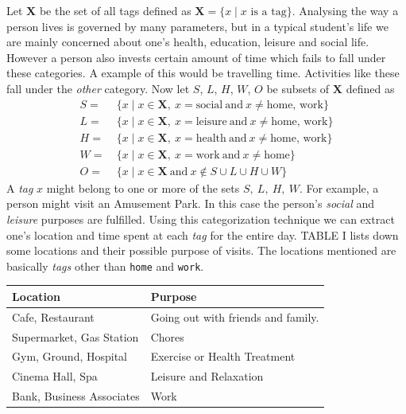 \documentclass[conference]{IEEEtran}
\begin{document}
Let $\mathbf{X}$ be the set of all tags defined as $\mathbf{X} = \{x \mid x\text{ is a tag}\}$. Analysing the way a person lives is governed by many parameters, but in a typical student\rq s life we are mainly concerned about one\rq s health, education, leisure and social life. However a person also invests certain amount of time which fails to fall under these categories. A example of this would be travelling time. Activities like these fall under the \textit{other} category. Now let $S$, $L$, $H$, $W$, $O$ be subsets of $\mathbf{X}$ defined as
\begin{align*}
S =\ &\{x \mid x \in \mathbf{X},\ x = \text{social}\ \textrm{and}\ x \neq \text{home, work}\} \\
L =\ &\{x \mid x \in \mathbf{X},\ x = \text{leisure}\ \textrm{and}\ x \neq \text{home, work}\} \\
H =\ &\{x \mid x \in \mathbf{X},\ x = \text{health}\ \textrm{and}\ x \neq \text{home, work}\} \\
W =\ &\{x \mid x \in \mathbf{X},\ x = \text{work}\ \textrm{and}\ x \neq \text{home}\} \\
O =\ & \{x \mid x \in \mathbf{X}\ \textrm{and}\ x \notin S\cup L\cup H\cup W \}
\end{align*}
A \textit{tag} $x$ might belong to one or more of the sets $S,\ L,\ H,\ W$. For example, a person might visit an Amusement Park. In this case the person\rq s \textit{social} and \textit{leisure} purposes are fulfilled. Using this categorization technique we can extract one\rq s location and time spent at each \textit{tag} for the entire day. TABLE I lists down some locations and their possible purpose of visits. The locations mentioned are basically \textit{tags} other than \texttt{home} and \texttt{work}.
\begin{table}
\small
{}
\begin{center}
\def\arraystretch{1.7}
\begin{tabular}{|l|l|}
\hline
 \bf Location & \bf Purpose \\
 \hline
 Cafe, Restaurant & Going out with friends and family. \\
 \hline
 Supermarket, Gas Station & Chores \\
 \hline
 Gym, Ground, Hospital & Exercise or Health Treatment \\
 \hline
 Cinema Hall, Spa & Leisure and Relaxation \\
\hline
Bank, Business Associates & Work \\
\hline
\end{tabular}
\end{center}
\end{table}
\end{document}
